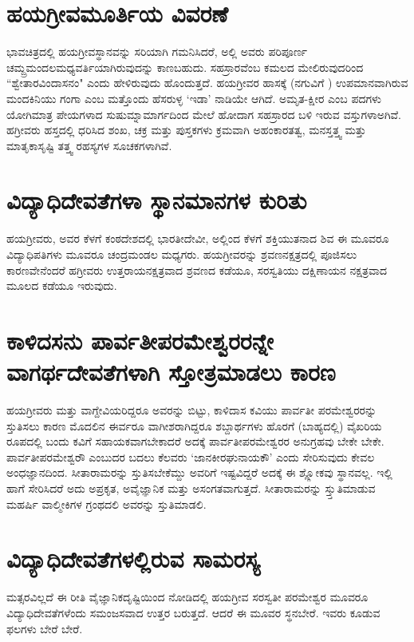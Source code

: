 \section*{ಹಯಗ್ರೀವಮೂರ್ತಿಯ ವಿವರಣೆ}

ಭಾವಚಿತ್ರದಲ್ಲಿ ಹಯಗ್ರೀವಸ್ಥಾನವನ್ನು ಸರಿಯಾಗಿ ಗಮನಿಸಿದರೆ, ಅಲ್ಲಿ ಅವರು ಪರಿಪೂರ್ಣ ಚಮ್ದ್ರಮಂದಲಮಧ್ಯವರ್ತಿಯಾಗಿರುವುದನ್ನು ಕಾಣಬಹುದು. ಸಹಸ್ರಾರವೆಂಬ ಕಮಲದ ಮೇಲಿರುವುದರಿಂದ ``ಶ್ವೇತಾರವಿಂದಾಸನಂ" ಎಂದು ಹೇಳಿರುವುದು ಹೊಂದುತ್ತದೆ. ಹಯಗ್ರೀವರ ಹಾಸಕ್ಕೆ (ನಗುವಿಗೆ ) ಉಪಮಾನವಾಗಿರುವ ಮಂದಕಿನಿಯು ಗಂಗಾ ಎಂಬ ಮತ್ತೊಂದು ಹೆಸರುಳ್ಳ `ಇಡಾ' ನಾಡಿಯೇ ಆಗಿದೆ. ಅಮೃತ-ಕ್ಷೀರ ಎಂಬ ಪದಗಳು ಯೋಗಿಮಾತ್ರ ಪೇಯಗಳಾದ ಸುಷುಮ್ನಾಮಾರ್ಗದಿಂದ ಮೇಲೆ ಹೋದಾಗ ಸಹಸ್ರಾರದ ಬಳಿ ಇರುವ ವಸ್ತುಗಳಾಅಗಿವೆ. ಹಗ್ರೀವರು ಹಸ್ತದಲ್ಲಿ ಧರಿಸಿದ ಶಂಖ, ಚಕ್ರ ಮತ್ತು ಪುಸ್ತಕಗಳು ಕ್ರಮವಾಗಿ ಅಹಂಕಾರತತ್ವ, ಮನಸ್ತತ್ತ್ವ ಮತ್ತು ಮಾತೃಕಾಸೃಷ್ಟಿ ತತ್ತ್ವ ರಹಸ್ಯಗಳ ಸೂಚಕಗಳಾಗಿವೆ.

\section*{ವಿದ್ಯಾಧಿದೇವತೆಗಳಾ ಸ್ಥಾನಮಾನಗಳ ಕುರಿತು}

ಹಯಗ್ರೀವರು, ಅವರ ಕೆಳಗೆ ಕಂಠದೇಶದಲ್ಲಿ ಭಾರತೀದೇವೀ, ಅಲ್ಲಿಂದ ಕೆಳಗೆ ಶಕ್ತಿಯುತನಾದ ಶಿವ ಈ ಮೂವರೂ ವಿದ್ಯಾಧಿಪತಿಗಳು ಮೂವರೂ ಚಂದ್ರಮಂಡಲ ಮಧ್ಯಗರು. ಹಯಗ್ರೀವರನ್ನು ಶ್ರವಣನಕ್ಷತ್ರದಲ್ಲಿ ಪೂಜಿಸಲು ಕಾರಣವೇನೆಂದರೆ ಹಗ್ರೀವರು ಉತ್ತರಾಯನಕ್ಷತ್ರವಾದ ಶ್ರವಣದ ಕಡೆಯೂ, ಸರಸ್ವತಿಯು ದಕ್ಷಿಣಾಯನ ನಕ್ಷತ್ರವಾದ ಮೂಲದ ಕಡೆಯೂ ಇರುವುದು.

\section*{ಕಾಳಿದಸನು ಪಾರ್ವತೀಪರಮೇಶ್ವರರನ್ನೇ ವಾಗರ್ಥದೇವತೆಗಳಾಗಿ ಸ್ತೋತ್ರಮಾಡಲು ಕಾರಣ}

ಹಯಗ್ರೀವರು ಮತ್ತು ವಾಗ್ದೇವಿಯರಿದ್ದರೂ ಅವರನ್ನು ಬಿಟ್ಟು, ಕಾಳಿದಾಸ ಕವಿಯು ಪಾರ್ವತೀ ಪರಮೇಶ್ವರರನ್ನು ಸ್ತುತಿಸಲು ಕಾರಣ ಮೊದಲಿನ ಈರ್ವರೂ ವಾಗೀಶರಾಗಿದ್ದರೂ ಶಬ್ದಾರ್ಥಗಳು ಹೊರಗೆ (ಬಾಹ್ಯದಲ್ಲಿ) ವೈಖರಿಯ ರೂಪದಲ್ಲಿ ಬಂದು ಕವಿಗೆ ಸಹಾಯಕವಾಗಬೇಕಾದರೆ ಅದಕ್ಕೆ ಪಾರ್ವತೀಪರಮೇಶ್ವರರ ಅನುಗ್ರಹವು ಬೇಕೇ ಬೇಕೇ. ಪಾರ್ವತೀಪರಮೇಶ್ವರೌ ಎಂಬುದರ ಬದಲು ಕೆಲವರು `ಜಾನಕೀರಘುನಾಯಕೌ' ಎಂದು ಸೇರಿಸುವುದು ಕೇವಲ ಅಂಧಜ್ಞಾನದಿಂದ. ಸೀತಾರಾಮರನ್ನು ಸ್ತುತಿಸಬೇಕೆಮ್ದು ಅವರಿಗೆ ಇಷ್ಟವಿದ್ದರೆ ಅದಕ್ಕೆ ಈ ಶ್ಲ್ಲೋಕವು ಸ್ಥಾನವಲ್ಲ. ಇಲ್ಲಿ ಹಾಗೆ ಸೇರಿಸಿದರೆ ಅದು ಅಪ್ರಕೃತ, ಅವೈಜ್ಞಾನಿಕ ಮತ್ತು ಅಸಂಗತವಾಗುತ್ತದೆ. ಸೀತಾರಾಮರನ್ನು ಸ್ತ್ತುತಿಮಾಡುವ ಮಹರ್ಷಿ ವಾಲ್ಮೀಕಿಗಳ ಗ್ರಂಥದಲಿ ಅವರನ್ನು  ಸ್ತುತಿಮಾಡಲಿ.

\section*{ವಿದ್ಯಾಧಿದೇವತೆಗಳಲ್ಲಿರುವ ಸಾಮರಸ್ಯ}

ಮತ್ಸರವಿಲ್ಲದೆ ಈ ರೀತಿ ವೈಜ್ಞಾನಿಕದೃಷ್ಟಿಯಿಂದ ನೋಡಿದಲ್ಲಿ ಹಯಗ್ರೀವ ಸರಸ್ವತೀ ಪರಮೇಶ್ವರ ಮೂವರೂ ವಿದ್ಯಾಧಿದೇವತೆಗಳೆಂದು ಸಮಂಜಸವಾದ ಉತ್ತರ ಬರುತ್ತದೆ. ಆದರೆ ಈ ಮೂವರ ಸ್ಥನಬೇರೆ. ಇವರು ಕೂಡುವ ಫಲಗಳು ಬೇರೆ ಬೇರೆ.
 
